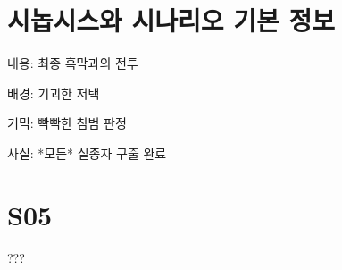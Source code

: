 \documentclass{report}
\begin{document}
	\section{시놉시스와 시나리오 기본 정보}
		내용: 최종 흑막과의 전투
		
		배경: 기괴한 저택
		
		기믹: 빡빡한 침범 판정
		
		사실: *모든* 실종자 구출 완료
	
	\section{S05}
		???
\end{document}
